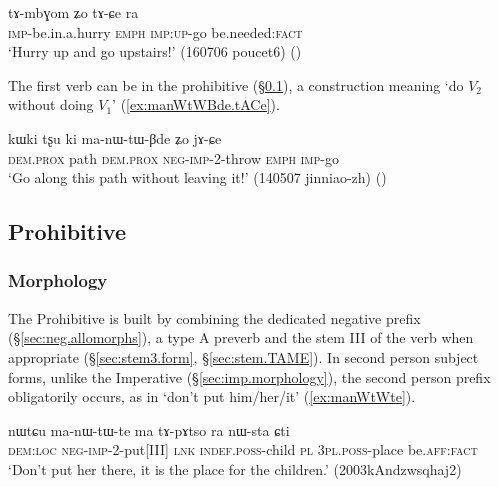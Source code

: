 \begin{exe}
\ex  \label{ex:tAmbGom.tACe}
\gll tɤ-mbɣom ʑo tɤ-ɕe ra\\
\textsc{imp}-be.in.a.hurry \textsc{emph} \textsc{imp}:\textsc{up}-go be.needed:\textsc{fact} \\
\glt `Hurry up and go upstairs!' (160706 poucet6) ()
\end{exe}
 
The first verb can be in the prohibitive (§\ref{sec:prohibitive}), a construction meaning `do $V_2$ without doing $V_1$' (\ref{ex:manWtWBde.tACe}).

\begin{exe}
\ex  \label{ex:manWtWBde.tACe}
\gll kɯki tʂu ki ma-nɯ-tɯ-βde ʑo jɤ-ɕe \\
\textsc{dem}.\textsc{prox} path \textsc{dem}.\textsc{prox} \textsc{neg}-\textsc{imp}-2-throw \textsc{emph} \textsc{imp}-go \\
\glt `Go along this path without leaving it!' (140507 jinniao-zh)
()
\end{exe}

\subsection{Prohibitive} \label{sec:prohibitive}
 
\subsubsection{Morphology} \label{sec:prohibitive.morpho}
The Prohibitive is built by combining the dedicated negative prefix  (§\ref{sec:neg.allomorphs}), a type A preverb and the stem III of the verb when appropriate (§\ref{sec:stem3.form}, §\ref{sec:stem.TAME}). In second person subject forms, unlike the Imperative (§\ref{sec:imp.morphology}), the second person prefix obligatorily occurs, as in  `don't put him/her/it' (\ref{ex:manWtWte}).

\begin{exe}
\ex  \label{ex:manWtWte}
\gll nɯtɕu ma-nɯ-tɯ-te ma tɤ-pɤtso ra nɯ-sta ɕti \\
\textsc{dem}:\textsc{loc} \textsc{neg}-\textsc{imp}-2-put[III] \textsc{lnk} \textsc{indef}.\textsc{poss}-child \textsc{pl} \textsc{3pl}.\textsc{poss}-place be.\textsc{aff}:\textsc{fact} \\
\glt `Don't put her there, it is the place for the children.' (2003kAndzwsqhaj2)
\end{exe}


